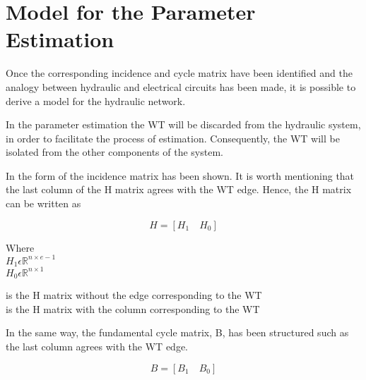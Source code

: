 \section{Model for the Parameter Estimation}  
\label{ParameterEstimation}
Once the corresponding incidence and cycle matrix have been identified and the analogy between hydraulic and
electrical circuits has been made, it is possible to derive a model for the hydraulic network. 

In the parameter estimation the WT will be discarded from the hydraulic system, 
in order to facilitate the process of estimation. Consequently, the WT will be isolated from the other components of the
system.  



In  the form of the incidence matrix has been shown. It is worth mentioning that the last column of the H matrix agrees with the WT edge. Hence, the H matrix can be written as 

\begin {equation}
H = [H_1 \quad H_0]
\label{Hmatrix}
\end{equation}

\begin{minipage}[t]{0.20\textwidth}
Where\\
\hspace*{8mm} $H_1 \epsilon \mathbb{R}^{n \times e-1}$  \\
\hspace*{8mm} $H_0 \epsilon \mathbb{R}^{n \times 1} $ 
\end{minipage}
\begin{minipage}[t]{0.68\textwidth}
\vspace*{2mm}
\hspace*{4mm} is the H matrix without the edge corresponding to the WT\\
\hspace*{4mm} is the H matrix with the column corresponding to the WT 
\end{minipage}

In the same way, the fundamental cycle matrix, B, has been structured such as the last column agrees with the WT edge.

\begin{equation}
  B = [B_1 \quad B_0]
\end{equation} 

